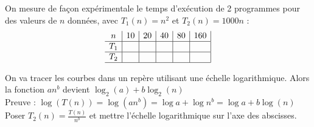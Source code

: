  On mesure de façon expérimentale le temps d'exécution de 2 programmes pour des valeurs de $n$ données, avec $T_1(n) = n^2$ et $T_2(n) = 1000n$ : 
$$\begin{array}{c|c|c|c|c|c|}
n	& 10 & 20 & 40 & 80 & 160 \\ \hline
T_1 & & & & & \\ \hline
T_2 & & & & & \\ \hline
\end{array}$$

 On va tracer les courbes dans un repère utilisant une échelle logarithmique. Alors la fonction $an^b$ devient $\log_2(a) + b\log_2(n)$ \\
Preuve : $\log(T(n)) = \log(an^b) = \log a + \log n^b = \log a + b\log(n)$ \\

 Poser $T_2(n) = \frac{T(n)}{n^b}$ et mettre l'échelle logarithmique sur l'axe des abscisses.
